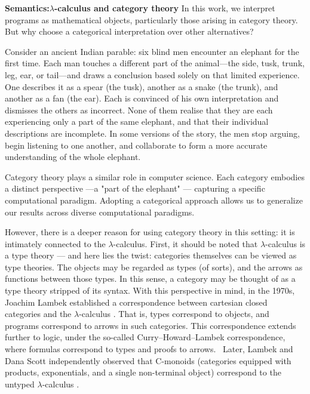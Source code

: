 

\noindent \textbf{Semantics:$\lambda$-calculus and category theory} In this work, we interpret programs as mathematical objects, particularly those arising in category theory. But why choose a categorical interpretation over other alternatives?

Consider an ancient Indian parable: six blind men encounter an elephant for the first time. Each man touches a different part of the animal—the side, tusk, trunk, leg, ear, or tail—and draws a conclusion based solely on that limited experience. One describes it as a spear (the tusk), another as a snake (the trunk), and another as a fan (the ear). Each is convinced of his own interpretation and dismisses the others as incorrect. None of them realise that they are each experiencing only a part of the same elephant, and that their individual descriptions are incomplete. In some versions of the story, the men stop arguing, begin listening to one another, and collaborate to form a more accurate understanding of the whole elephant. 

Category theory plays a similar role in computer science. Each category embodies a distinct perspective ---a "part of the elephant" --- capturing a specific computational paradigm. Adopting a categorical approach allows us to generalize our results across diverse computational paradigms.


However, there is a deeper reason for using category theory in this setting: it is intimately connected to the $\lambda$-calculus. First, it should be noted that $\lambda$-calculus is a type theory --- and here lies the twist: categories themselves can be viewed as type theories. The objects may be regarded as types (of sorts), and the arrows as functions between those types. In this sense, a category may be thought of as a type theory stripped of its syntax. With this perspective in mind, in the 1970s, Joachim Lambek established a correspondence between cartesian closed categories and the $\lambda$-calculus \cite{lambek1980lambda}. That is, types correspond to objects, and programs correspond to arrows in such categories. This correspondence extends further to logic, under the so-called Curry–Howard–Lambek correspondence, where formulas correspond to types and proofs to arrows.  Later, Lambek and Dana Scott independently observed that C-monoids (\ie categories equipped with products, exponentials, and a single non-terminal object) correspond to the untyped $\lambda$-calculus \cite{lambekscott988}.





